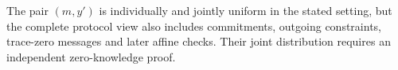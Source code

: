 \begin{remark}
The pair $(m,y')$ is individually and jointly
uniform in the stated setting, but the complete
protocol view also includes commitments, outgoing
constraints, trace-zero messages and later affine
checks. Their joint distribution requires an
independent zero-knowledge proof.
\end{remark}
